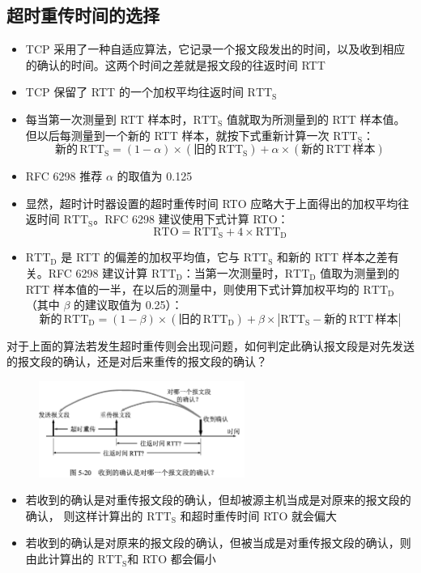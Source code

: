 \documentclass[cs4size,a4paper,10pt]{ctexart}
\begin{document}
	\subsection{超时重传时间的选择}
	\begin{itemize}
		\item TCP 采用了一种自适应算法，它记录一个报文段发出的时间，以及收到相应的确认的时间。这两个时间之差就是报文段的往返时间 RTT 
		\item TCP 保留了 RTT 的一个加权平均往返时间 $\mathrm{RTT_S}$
		\item 每当第一次测量到 RTT 样本时，$\mathrm{RTT_S}$ 值就取为所测量到的 RTT 样本值。但以后每测量到一个新的 RTT 样本，就按下式重新计算一次 $\mathrm{RTT_S}$：
		$$\mbox{新的}\,  \mathrm{RTT_S}  = (1-\alpha) \times (  \mbox{旧的}\,   \mathrm{RTT_S}) +\alpha \times (  \mbox{新的}\,   \mathrm{RTT}  \, \mbox{样本})$$
		\item RFC 6298 推荐 $\alpha$ 的取值为 0.125
		\item 显然，超时计时器设置的超时重传时间 RTO 应略大于上面得出的加权平均往返时间 $\mathrm{RTT_S}$。RFC 6298 建议使用下式计算 RTO：
		$$\mathrm{RTO = RTT_S + 4\times RTT_D}$$
		\item $\mathrm{RTT_D}$ 是 RTT 的偏差的加权平均值，它与 $\mathrm{RTT_S}$ 和新的 RTT 样本之差有关。RFC 6298 建议计算 $\mathrm{RTT_D}$：当第一次测量时，$\mathrm{RTT_D}$ 值取为测量到的 RTT 样本值的一半，在以后的测量中，则使用下式计算加权平均的 $\mathrm{RTT_D}$（其中 $\beta$ 的建议取值为 0.25）：
		$$\mbox{新的}\,   \mathrm{RTT_D} = (1-\beta) \times ( \mbox{旧的}\,   \mathrm{RTT_D} ) + \beta \times |\mathrm{RTT_S} -  \mbox{新的}\,  \mathrm{RTT}\,  \mbox{样本} |$$
	\end{itemize}

	对于上面的算法若发生超时重传则会出现问题，如何判定此确认报文段是对先发送的报文段的确认，还是对后来重传的报文段的确认？

	\begin{figure}[H]
		\centering
		\includegraphics[width=0.6\textwidth]{img/5.20}
	\end{figure}

	\begin{itemize}
		\item 若收到的确认是对重传报文段的确认，但却被源主机当成是对原来的报文段的确认， 则这样计算出的 $\mathrm{RTT_S}$ 和超时重传时间 RTO 就会偏大
		\item 若收到的确认是对原来的报文段的确认，但被当成是对重传报文段的确认，则 由此计算出的 $\mathrm{RTT_S}$和 RTO 都会偏小
	\end{itemize}
\end{document}
